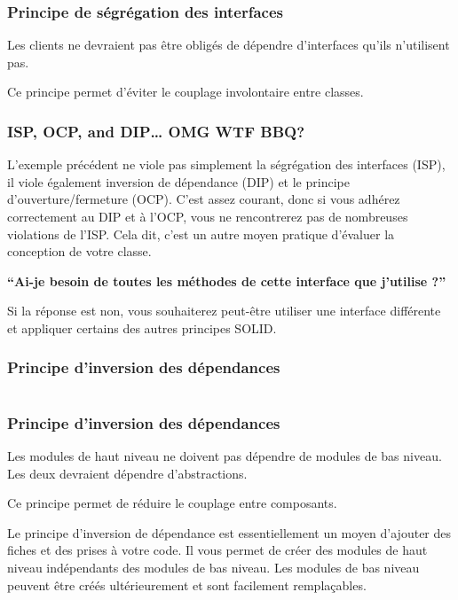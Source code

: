 \begin{frame}
    \frametitle{Principe de ségrégation des interfaces}

    Les clients ne devraient pas être obligés de dépendre d’interfaces qu’ils n’utilisent pas.

    Ce principe permet d'éviter le couplage involontaire entre classes.
\end{frame}

\begin{frame}
    \frametitle{ISP, OCP, and DIP… OMG WTF BBQ?}

    L'exemple précédent ne viole pas simplement la ségrégation des interfaces (ISP),
    il viole également inversion de dépendance (DIP) et le principe d'ouverture/fermeture (OCP).
    C’est assez courant, donc si vous adhérez correctement au DIP et à l’OCP,
    vous ne rencontrerez pas de nombreuses violations de l'ISP.
    Cela dit, c'est un autre moyen pratique d'évaluer la conception de votre classe.

    \bigskip
    \textbf{``Ai-je besoin de toutes les méthodes de cette interface que j'utilise ?''}

    Si la réponse est non, vous souhaiterez peut-être utiliser une interface différente
    et appliquer certains des autres principes SOLID.
\end{frame}

\begin{frame}
    \frametitle{Principe d'inversion des dépendances}

    \begin{columns}
        \begin{column}{0.5\textwidth}
            C},
                label=lst:dip-ko]
            {figures/pratiques/dip-ko.cs}
        \end{column}
        \pause
        \begin{column}{0.5\textwidth}
            C},
                label=lst:dip-ok]
            {figures/pratiques/dip-ok.cs}
        \end{column}
    \end{columns}
\end{frame}

\begin{frame}
    \frametitle{Principe d'inversion des dépendances}

    Les modules de haut niveau ne doivent pas dépendre de modules de bas niveau.
    Les deux devraient dépendre d’abstractions.

    Ce principe permet de réduire le couplage entre composants.

    \bigskip
    Le principe d'inversion de dépendance est essentiellement un moyen d'ajouter des fiches et des prises à votre code.
    Il vous permet de créer des modules de haut niveau indépendants des modules de bas niveau.
    Les modules de bas niveau peuvent être créés ultérieurement et sont facilement remplaçables.
\end{frame}

